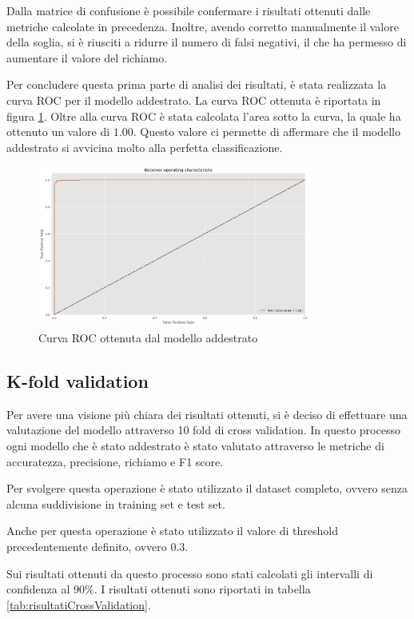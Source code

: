 Dalla matrice di confusione è possibile confermare i risultati ottenuti dalle
metriche calcolate in precedenza. Inoltre, avendo corretto manualmente il valore
della soglia, si è riusciti a ridurre il numero di falsi negativi, il che ha
permesso di aumentare il valore del richiamo.

Per concludere questa prima parte di analisi dei risultati, è stata realizzata
la curva ROC per il modello addestrato. La curva ROC ottenuta è riportata in
figura \ref{fig:curvaRocReteNeurale}. Oltre alla curva ROC è stata calcolata
l'area sotto la curva, la quale ha ottenuto un valore di $1.00$. Questo valore
ci permette di affermare che il modello addestrato si avvicina molto alla
perfetta classificazione.

\begin{figure}[!ht]
    \centering
    \includegraphics[width=0.8\textwidth]{img/rete/curva_roc.png}
    \caption{Curva ROC ottenuta dal modello addestrato}
    \label{fig:curvaRocReteNeurale}
\end{figure}
\subsection*{K-fold validation}
Per avere una visione più chiara dei risultati ottenuti, si è deciso di effettuare
una valutazione del modello attraverso 10 fold di cross validation. In questo
processo ogni modello che è stato addestrato è stato valutato attraverso le
metriche di accuratezza, precisione, richiamo e F1 score.

Per svolgere questa operazione è stato utilizzato il dataset completo, ovvero
senza alcuna suddivisione in training set e test set.

Anche per questa operazione è stato utilizzato il valore di threshold precedentemente
definito, ovvero $0.3$.

Sui risultati ottenuti da questo processo sono stati calcolati gli intervalli
di confidenza al $90\%$. I risultati ottenuti sono riportati in tabella
\ref{tab:risultatiCrossValidation}.

